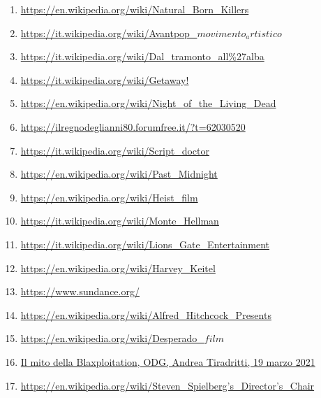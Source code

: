 \documentclass[12pt]{article} %
\begin{document}
\begin{flushleft}
\begin{enumerate}
        \item \href{https://en.wikipedia.org/wiki/Natural_Born_Killers}{https://en.wikipedia.org/wiki/Natural\_Born\_Killers}
        \item \href{https://it.wikipedia.org/wiki/Avantpop_(movimento_artistico)}{https://it.wikipedia.org/wiki/Avantpop\_\(movimento_artistico\)}
        \item \href{https://it.wikipedia.org/wiki/Dal_tramonto_all%27alba}{https://it.wikipedia.org/wiki/Dal\_tramonto\_all\%27alba}
        \item \href{https://it.wikipedia.org/wiki/Getaway!}{https://it.wikipedia.org/wiki/Getaway!}
        \item \href{https://en.wikipedia.org/wiki/Night_of_the_Living_Dead}{https://en.wikipedia.org/wiki/Night\_of\_the\_Living\_Dead}
        \item \href{https://ilregnodeglianni80.forumfree.it/?t=62030520}{https://ilregnodeglianni80.forumfree.it/?t=62030520}
        \item \href{https://it.wikipedia.org/wiki/Script_doctor}{https://it.wikipedia.org/wiki/Script\_doctor}
        \item \href{https://en.wikipedia.org/wiki/Past_Midnight}{https://en.wikipedia.org/wiki/Past\_Midnight}
        \item \href{https://en.wikipedia.org/wiki/Heist_film}{https://en.wikipedia.org/wiki/Heist\_film}
        \item \href{https://it.wikipedia.org/wiki/Monte_Hellman}{https://it.wikipedia.org/wiki/Monte\_Hellman}
        \item \href{https://it.wikipedia.org/wiki/Lions_Gate_Entertainment}{https://it.wikipedia.org/wiki/Lions\_Gate\_Entertainment}
        \item \href{https://en.wikipedia.org/wiki/Harvey_Keitel}{https://en.wikipedia.org/wiki/Harvey\_Keitel}
        \item \href{https://www.sundance.org/}{https://www.sundance.org/}
        \item \href{https://en.wikipedia.org/wiki/Alfred_Hitchcock_Presents}{https://en.wikipedia.org/wiki/Alfred\_Hitchcock\_Presents}
        \item \href{https://en.wikipedia.org/wiki/Desperado_(film)}{https://en.wikipedia.org/wiki/Desperado\_\(film\)}
        \item \href{https://www.odgmagazine.com/il-mito-della-blaxploitation/}{Il mito della Blaxploitation, ODG, Andrea Tiradritti, 19 marzo 2021}
        \item \href{https://en.wikipedia.org/wiki/Steven_Spielberg%27s_Director%27s_Chair}{https://en.wikipedia.org/wiki/Steven\_Spielberg's\_Director's\_Chair}

\end{enumerate}
\end{flushleft}
\end{document}
